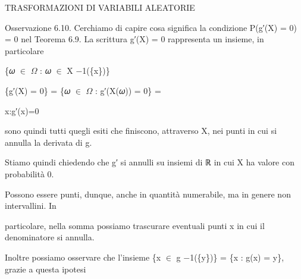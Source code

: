 \documentclass[a4paper,portrait,12pt]{article}
\begin{document}





\begin{flushleft}
TRASFORMAZIONI DI VARIABILI ALEATORIE
\end{flushleft}





\begin{flushleft}
Osservazione 6.10. Cerchiamo di capire cosa significa la condizione P(g′(X) = 0) = 0 nel Teorema 6.9. La scrittura g′(X) = 0 rappresenta un insieme, in particolare
\end{flushleft}


\begin{flushleft}
\{𝜔 $\in$ $\Omega$ : 𝜔 $\in$ X $-$1(\{x\})\}
\end{flushleft}





\begin{flushleft}
\{g′(X) = 0\} = \{𝜔 $\in$ $\Omega$ : g′(X(𝜔)) = 0\} =
\end{flushleft}


\begin{flushleft}
x:g′(x)=0
\end{flushleft}





\begin{flushleft}
sono quindi tutti quegli esiti che finiscono, attraverso X, nei punti in cui si annulla la derivata di g.
\end{flushleft}


\begin{flushleft}
Stiamo quindi chiedendo che g′ si annulli su insiemi di ℝ in cui X ha valore con probabilit\`{a} 0.
\end{flushleft}


\begin{flushleft}
Possono essere punti, dunque, anche in quantit\`{a} numerabile, ma in genere non intervallini. In
\end{flushleft}


\begin{flushleft}
particolare, nella somma possiamo trascurare eventuali punti x in cui il denominatore si annulla.
\end{flushleft}


\begin{flushleft}
Inoltre possiamo osservare che l'insieme \{x $\in$ g $-$1(\{y\})\} = \{x : g(x) = y\}, grazie a questa ipotesi
\end{flushleft}
\end{document}
